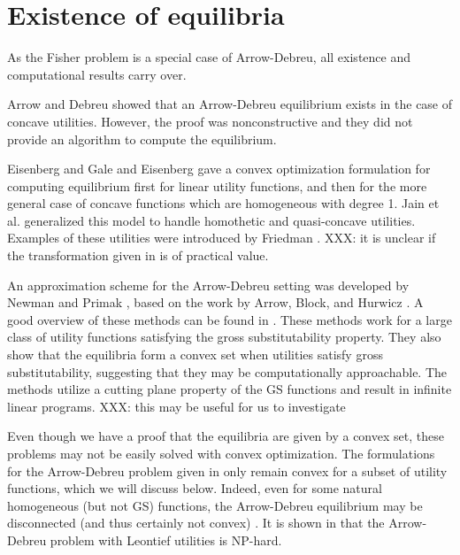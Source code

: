 \documentclass{article}
\begin{document}
\section{Existence of equilibria}
As the Fisher problem is a special case of Arrow-Debreu, all existence and computational results carry over.

Arrow and Debreu \cite{arrow1954existence} showed that an Arrow-Debreu equilibrium exists in the case of concave utilities. 
However, the proof was nonconstructive and they did not provide an algorithm to compute the equilibrium.

Eisenberg and Gale \cite{eisenberg1959consensus, gale1960theory} and Eisenberg \cite{eisenberg1961aggregation} gave a convex optimization formulation
for computing equilibrium first for linear utility functions, and then for the more general case of concave functions which are homogeneous with degree 1.
Jain et al. \cite{jain2005market} generalized this model to handle homothetic and quasi-concave utilities.
Examples of these utilities were introduced by Friedman \cite{friedman1973concavity}.
XXX: it is unclear if the transformation given in \cite{jain2005market} is of practical value.

An approximation scheme for the Arrow-Debreu setting was developed by Newman and Primak \cite{newman1992complexity}, based on the work by Arrow, Block, and Hurwicz \cite{arrow1958stability}. A good overview of these methods can be found in \cite{codenotti2005polynomial}. These methods work for a large class of utility functions satisfying the gross substitutability property. They also show that the equilibria form a convex set when utilities satisfy gross substitutability, suggesting that they may be computationally approachable. The methods utilize a cutting plane property of the GS functions and result in infinite linear programs. XXX: this may be useful for us to investigate

Even though we have a proof that the equilibria are given by a convex set, these problems may not be easily solved with convex optimization. The formulations for the Arrow-Debreu problem given in \cite{jain2007polynomial,chen2010equilibrium} only remain convex for a subset of utility functions, which we will discuss below. Indeed, even for some natural homogeneous (but not GS) functions, the Arrow-Debreu equilibrium may be disconnected (and thus certainly not convex) \cite{gjerstad1996multiple}.
It is shown in \cite{codenotti2006leontief} that the Arrow-Debreu problem with Leontief utilities is NP-hard.
\end{document}
